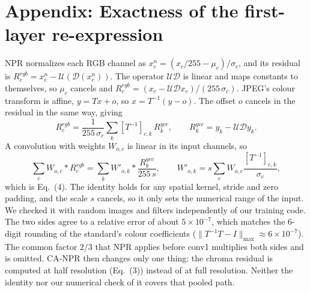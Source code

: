 \documentclass[conference]{IEEEtran}
\begin{document}
\appendix
\section*{Appendix: Exactness of the first-layer re-expression}
NPR normalizes each RGB channel as $x^n_c=(x_c/255-\mu_c)/\sigma_c$, and its residual is
$R^{rgb}_c=x^n_c-\mathcal{U}(\mathcal{D}(x^n_c))$. The operator $\mathcal{U}\mathcal{D}$ is linear
and maps constants to themselves, so $\mu_c$ cancels and $R^{rgb}_c=(x_c-\mathcal{U}\mathcal{D}x_c)
/(255\,\sigma_c)$. JPEG's colour transform is affine, $y=Tx+o$, so $x=T^{-1}(y-o)$. The offset $o$
cancels in the residual in the same way, giving
\begin{equation}
R^{rgb}_c=\frac{1}{255\,\sigma_c}\sum_k [T^{-1}]_{c,k}\,R^{ycc}_k,\qquad
R^{ycc}_k=y_k-\mathcal{U}\mathcal{D}y_k .
\end{equation}
A convolution with weights $W_{o,c}$ is linear in its input channels, so
\begin{equation}
\sum_c W_{o,c}*R^{rgb}_c=\sum_k W'_{o,k}*\frac{R^{ycc}_k}{255\,s},\qquad
W'_{o,k}=s\sum_c W_{o,c}\frac{[T^{-1}]_{c,k}}{\sigma_c},
\end{equation}
which is Eq.~(4). The identity holds for any spatial kernel, stride and zero padding, and the scale
$s$ cancels, so it only sets the numerical range of the input. We checked it with random images
and filters independently of our training code. The two sides agree to a relative error of about
$5{\times}10^{-7}$, which matches the 6-digit rounding of the standard's colour coefficients
($\|T^{-1}T-I\|_{\max}\approx 6{\times}10^{-7}$). The common factor $2/3$ that NPR applies before conv1
multiplies both sides and is omitted. CA-NPR then changes only one thing: the chroma residual is
computed at half resolution (Eq.~(3)) instead of at full resolution. Neither the identity nor our
numerical check of it covers that pooled path.



\end{document}
